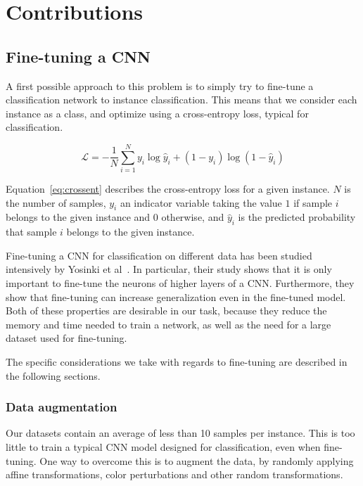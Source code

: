 
\chapter{Contributions}
\section{Fine-tuning a CNN}\label{sec:finetuning}
A first possible approach to this problem is to simply try to fine-tune
a classification network to instance classification. This means that
we consider each instance as a class, and optimize using a cross-entropy
loss, typical for classification.

\begin{equation}\label{eq:crossent}
\mathcal{L} = - \frac{1}{N}
\sum_{i=1}^N y_i \log \hat{y}_i + (1-y_i) \log (1-\hat{y}_i)
\end{equation}

Equation~\ref{eq:crossent} describes the cross-entropy loss for a
given instance. $N$ is the number of samples, $y_i$ an indicator
variable taking the value $1$ if sample $i$ belongs to the given
instance and $0$ otherwise, and $\hat{y}_i$ is the predicted probability
that sample $i$ belongs to the given instance.

Fine-tuning a CNN for classification on different data has been studied
intensively by Yosinki et al~\cite{yosinski_how_2014}. In particular,
their study shows that it is only important to fine-tune the neurons
of higher layers of a CNN. Furthermore, they show that
fine-tuning can increase generalization even in the fine-tuned model.
Both of these properties are desirable in our task, because they reduce
the memory and time needed to train a network, as well as the need
for a large dataset used for fine-tuning.

The specific considerations we take with regards to fine-tuning are
described in the following sections.

\subsection{Data augmentation}
Our datasets %
contain an average of less than 10 samples per instance. This is too little
to train a typical CNN model designed for classification, even when
fine-tuning.
One way to overcome this is to augment the data, by randomly applying
affine transformations, color perturbations and other random transformations.

